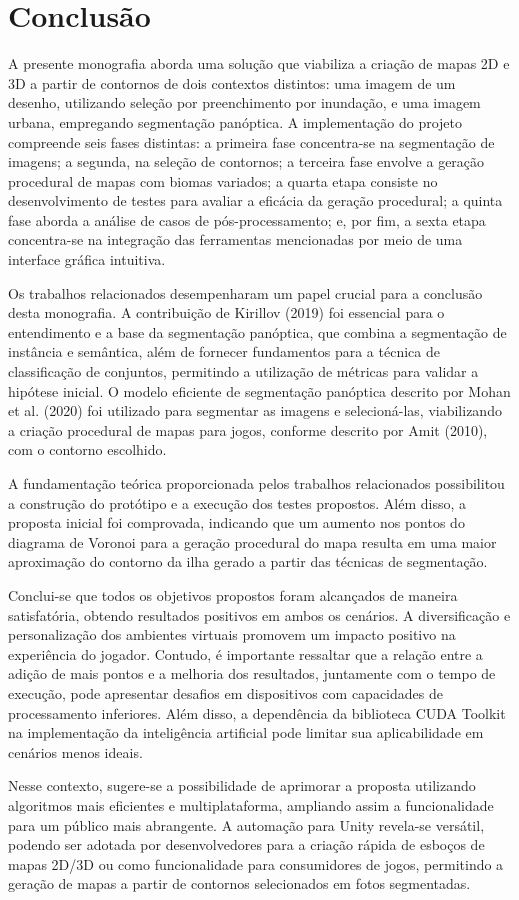 \section{Conclusão}

A presente monografia aborda uma solução que viabiliza a criação de mapas 2D e 3D a partir de contornos de dois contextos distintos: uma imagem de um desenho, utilizando seleção por preenchimento por inundação, e uma imagem urbana, empregando segmentação panóptica. A implementação do projeto compreende seis fases distintas: a primeira fase concentra-se na segmentação de imagens; a segunda, na seleção de contornos; a terceira fase envolve a geração procedural de mapas com biomas variados; a quarta etapa consiste no desenvolvimento de testes para avaliar a eficácia da geração procedural; a quinta fase aborda a análise de casos de pós-processamento; e, por fim, a sexta etapa concentra-se na integração das ferramentas mencionadas por meio de uma interface gráfica intuitiva.

Os trabalhos relacionados desempenharam um papel crucial para a conclusão desta monografia. A contribuição de Kirillov (2019) foi essencial para o entendimento e a base da segmentação panóptica, que combina a segmentação de instância e semântica, além de fornecer fundamentos para a técnica de classificação de conjuntos, permitindo a utilização de métricas para validar a hipótese inicial. O modelo eficiente de segmentação panóptica descrito por Mohan et al. (2020) foi utilizado para segmentar as imagens e selecioná-las, viabilizando a criação procedural de mapas para jogos, conforme descrito por Amit (2010), com o contorno escolhido.

A fundamentação teórica proporcionada pelos trabalhos relacionados possibilitou a construção do protótipo e a execução dos testes propostos. Além disso, a proposta inicial foi comprovada, indicando que um aumento nos pontos do diagrama de Voronoi para a geração procedural do mapa resulta em uma maior aproximação do contorno da ilha gerado a partir das técnicas de segmentação.

Conclui-se que todos os objetivos propostos foram alcançados de maneira satisfatória, obtendo resultados positivos em ambos os cenários. A diversificação e personalização dos ambientes virtuais promovem um impacto positivo na experiência do jogador. Contudo, é importante ressaltar que a relação entre a adição de mais pontos e a melhoria dos resultados, juntamente com o tempo de execução, pode apresentar desafios em dispositivos com capacidades de processamento inferiores. Além disso, a dependência da biblioteca CUDA Toolkit na implementação da inteligência artificial pode limitar sua aplicabilidade em cenários menos ideais.

Nesse contexto, sugere-se a possibilidade de aprimorar a proposta utilizando algoritmos mais eficientes e multiplataforma, ampliando assim a funcionalidade para um público mais abrangente. A automação para Unity revela-se versátil, podendo ser adotada por desenvolvedores para a criação rápida de esboços de mapas 2D/3D ou como funcionalidade para consumidores de jogos, permitindo a geração de mapas a partir de contornos selecionados em fotos segmentadas.